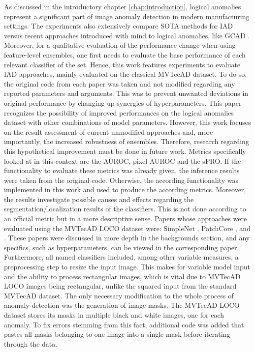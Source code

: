 As discussed in the introductory chapter \ref{chap:introduction}, logical anomalies represent a significant part of image anomaly detection in modern
manufacturing settings. The experiments also extensively compare SOTA methods for IAD versus recent approaches  
introduced with mind to logical anomalies, like GCAD \cite{LOCODentsAndScratchesBergmann2022}. 
Moreover, for a qualitative evaluation of the performance change when using feature-level ensembles, one first needs to evaluate the base performance 
of each relevant classifier of the set. 
Hence, this work features experiments to evaluate IAD approaches, mainly evaluated on the classical MVTecAD dataset. To do so, the original 
code from each paper was taken and not modified regarding any reported parameters and arguments. This was to prevent unwanted deviations 
in original performance by changing up synergies of hyperparameters. This paper recognizes the possibility of improved performances on the logical anomalies dataset 
with other combinations of model parameters. However, this work focuses on the result assessment of current unmodified approaches and, more importantly, the increased robustness of ensembles. Therefore, research regarding this hypothetical improvement must be done in future work. Metrics specifically looked at in this context are the AUROC, pixel AUROC and the sPRO. 
If the functionality to evaluate these metrics was already given, the inference results were taken from the original code. Otherwise, the according functionality 
was implemented in this work and used to produce the according metrics. Moreover, the results investigate possible causes and effects regarding the segmentation/localization results of the 
classifiers. This is not done according to an official metric but in a more descriptive sense.
Papers whose approaches were evaluated using the MVTecAD LOCO dataset were: SimpleNet \cite{liu2023simplenet}, PatchCore \cite{patchCore2022}, \cite{csflow2022} and \cite{Zavrtanik_2021DRAEM}. 
These papers were discussed in more depth in the backgrounds section, and any specifics, such as 
hyperparameters, can be viewed in the corresponding paper. Furthermore, all named classifiers included, among other variable measures, 
a preprocessing step to resize the input image. This makes for variable model input and the ability to process rectangular images, 
which is vital due to MVTecAD LOCO images being rectangular, unlike the squared input from the standard MVTecAD dataset. The only 
necessary modification to the whole process of anomaly detection was the generation of image masks. The MVTecAD LOCO dataset stores its 
masks in multiple black and white images, one for each anomaly. To fix errors stemming from this fact, additional 
code was added that pastes all masks belonging to one image into a single mask before iterating through the data. 




